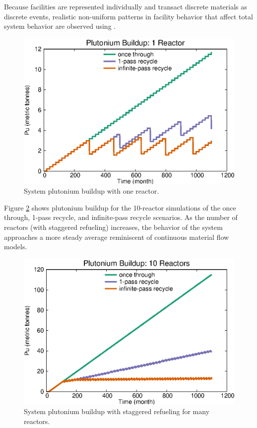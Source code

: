 Because facilities are represented individually and transact discrete
materials as discrete events, realistic non-uniform patterns in facility
behavior that affect total system behavior are observed using \Cyclus.

\begin{figure}[H]
\begin{center}
\includegraphics{./images/puseries-1.eps}
\end{center}
\caption{System plutonium buildup with one reactor.}
\label{fig:puseries1}
\end{figure}

Figure \ref{fig:puseriesn} shows plutonium buildup for the 10-reactor
simulations of the once through, 1-pass recycle, and infinite-pass recycle
scenarios.  As the number of reactors (with staggered refueling) increases,
the behavior of the system approaches a more steady average reminiscent of
continuous material flow models.

\begin{figure}[H]
\begin{center}
\includegraphics{./images/puseries-n.eps}
\end{center}
\caption{System plutonium buildup with staggered refueling for many reactors.}
\label{fig:puseriesn}
\end{figure}


